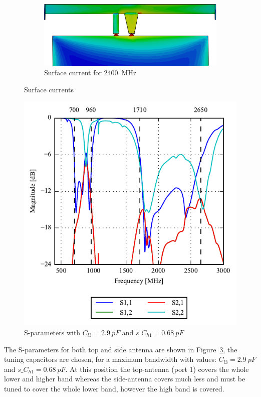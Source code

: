 \begin{figure}[htbp]
\begin{subfigure}[b]{0.32\linewidth}
        \centering
        \includegraphics[width=\linewidth]{img/tech_sol/nonresonant/finka-surface-2400}
        \caption{Surface current for \SI{2400}{MHz}}
        \label{fig:ant3_sc2400}
    \end{subfigure}
    \caption{Surface currents}
    \label{fig:ant3_sc}
\end{figure}


\begin{figure}[htbp]
    \centering
    \includegraphics{img/tech_sol/nonresonant/simulation/freespace/Spara-static}
    \caption{S-parameters with $C_{l3} = \SI{2.9}{pF}$ and $s\_C_{h1} = \SI{0.68}{pF}$}
    \label{fig:ant3sparams}
\end{figure}

The S-parameters for both top and side antenna are shown in Figure~\ref{fig:ant3sparams}, the tuning capacitors are chosen, for a maximum bandwidth with values: $C_{l3} = \SI{2.9}{pF}$ and $s\_C_{h1} = \SI{0.68}{pF}$. At this position the top-antenna (port 1) covers the whole lower and higher band whereas the side-antenna covers much less and must be tuned to cover the whole lower band, however the high band is covered. 

